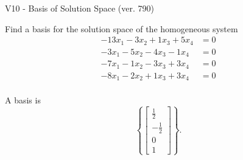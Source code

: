 \begin{exercise}
  \begin{exerciseTitle}V10 - Basis of Solution Space (ver. 790)\end{exerciseTitle}
  \begin{exerciseStatement}
    Find a basis for the solution space of the homogeneous system 
\begin{align*}
 -13 x_ 1 -3 x_ 2 + 1 x_ 3 + 5 x_ 4 &= 0  \\ 
  -3 x_ 1 -5 x_ 2 -4 x_ 3 -1 x_ 4 &= 0  \\ 
  -7 x_ 1 -1 x_ 2 -3 x_ 3 + 3 x_ 4 &= 0  \\ 
  -8 x_ 1 -2 x_ 2 + 1 x_ 3 + 3 x_ 4 &= 0  \\ 
 \end{align*}


 
  \end{exerciseStatement}

  \begin{exerciseAnswer}
   A basis is   
\[\left\{\left[\begin{array}{c}
\frac{1}{2} \\
-\frac{1}{2} \\
0 \\
1
\end{array}\right]\right\}.\]

  


  \end{exerciseAnswer}
\end{exercise}